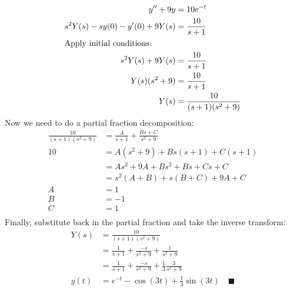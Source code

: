 \documentclass[letterpaper, fontsize=11pt]{scrartcl} %
\numberwithin{equation}{section} %
\numberwithin{figure}{section} %
\numberwithin{table}{section} %
\begin{document}
\begin{enumerate}
\begin{enumerate}
\begin{align*}
y'' + 9y &= 10e^{-t}\\
s^2Y(s) - sy(0) - y'(0) + 9Y(s) &= \frac{10}{s+1}\\
\intertext{Apply initial conditions:}
s^2Y(s) + 9Y(s) &= \frac{10}{s+1}\\
Y(s)(s^2 + 9) &= \frac{10}{s+1}\\
Y(s) &= \frac{10}{(s+1)(s^2 + 9)}
\end{align*}
Now we need to do a partial fraction decomposition:
\begin{align*}
\frac{10}{(s+1)(s^2 + 9)} &= \frac{A}{s+1} + \frac{Bs + C}{s^2 + 9} \\
10 &= A(s^2 + 9) + Bs(s+1) + C(s+1)\\
&= As^2 + 9A + Bs^2 + Bs + Cs + C\\
&= s^2(A+B) + s(B+ C) + 9A + C\\
A&= 1\\
B&= -1\\
C&= 1\\
\end{align*}
Finally, substitute back in the partial fraction and take the inverse transform:
\begin{align*}
Y(s) &= \frac{10}{(s+1)(s^2 + 9)}\\
&= \frac{1}{s+1} + \frac{-s}{s^2 + 9} +  \frac{1}{s^2 + 9}\\
&= \frac{1}{s+1} + \frac{-s}{s^2 + 9} +  \frac{1}{3}\frac{3}{s^2 + 9}\\
y(t) &= e^{-t} - \cos(3t) + \frac{1}{3}\sin(3t)\quad\blacksquare
\end{align*}


\end{enumerate}
\end{enumerate}
\end{document}
